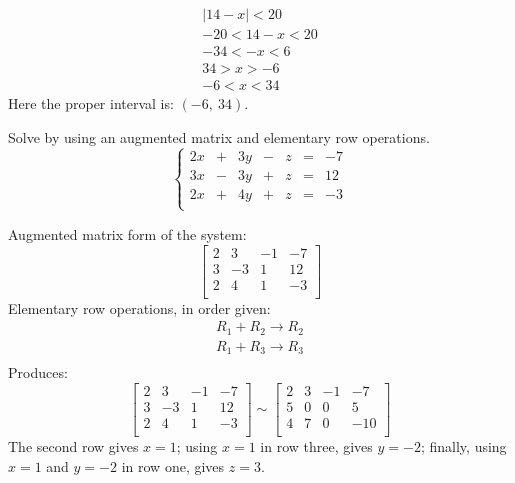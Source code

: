 \documentclass[12pt,addpoints, answers, fleqn]{exam}
\begin{document}
\begin{questions}
\begin{solution}
\begin{eqnarray*}
\left|  14 - x \right|  < 20\\
-20 <   14 - x   < 20\\
-34 <   - x   < 6\\
34 >   x   > -6\\
-6 <   x   < 34
\end{eqnarray*}
Here the proper interval is: $\boxed{\left(-6, \ 34 \right)}$.
\end{solution}
\question Solve by using an augmented matrix and elementary row operations.
\[
\left\{ {\begin{array}{rcrcrcr}
   2x   & + & 3y  & - & z & = &  -7\\
   3x   & - & 3y  & + & z & = &  12\\
   2x   & + & 4y  & + & z & = &  -3\\
\end{array}} \right.
\]
\begin{solution} Augmented matrix form of the system:
\[
\left[ {\begin{array}{rrr|r}
   2 &  3 &  -1 & -7 \\
   3 &  -3 &  1 &  12 \\
   2 &  4 &  1 & -3 \\
\end{array}} \right]
\]
Elementary row operations, in order given:
\begin{eqnarray*}
R_1 + R_2 \to R_2 \\
R_1 +   R_3 \to R_3 \\
\end{eqnarray*}
Produces:
\[
\left[ {\begin{array}{rrr|r}
   2 &  3 &  -1 & -7 \\
   3 &  -3 &  1 &  12 \\
   2 &  4 &  1 & -3 \\
\end{array}} \right]
\sim
\left[ {\begin{array}{rrr|r}
   2 &   3 &   -1 & -7 \\
   5 &  0 &  0 &  5 \\
   4 &   7 &   0 & -10 \\
\end{array}} \right]
\]
The second row gives $\boxed{x = 1}$; using $x = 1$ in row three, gives $\boxed{y=-2}$; finally, using $x = 1$ and $y=-2$ in row one, gives $\boxed{z=3}$.
\end{solution}

\end{questions}
\end{document}
